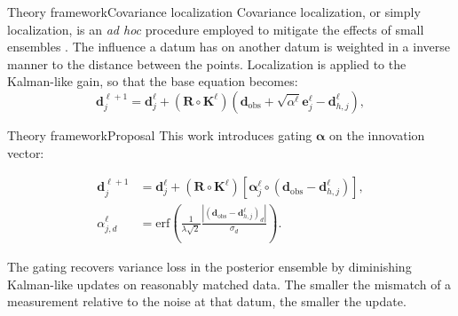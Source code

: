 \begin{frame}{Theory framework}{Covariance localization}
    Covariance localization, or simply localization, 
    is an \emph{ad hoc} procedure employed to mitigate the effects of small ensembles 
    \cite[section 7.5]{Emerick:2025}.
    \vfill
    The influence a datum has on another datum is weighted
    in a inverse manner to the distance between the points.
    \vfill
    Localization is applied to the Kalman-like gain,
    so that the base equation becomes:
    \begin{equation}
        \mathbf{d}_j^{\ell+1} 
        =
        \mathbf{d}_j^\ell + (\mathbf{R}\circ\mathbf{K}^\ell)
        (\mathbf{d}_\text{obs} + \sqrt{\alpha^\ell}\mathbf{e}_j^\ell - \mathbf{d}_{h, j}^\ell),
    \label{eq:iteration_dsiesmda}
    \end{equation}
\end{frame}

\begin{frame}{Theory framework}{Proposal}
    This work introduces gating $\bm{\alpha}$ on the innovation vector:  

    \begin{subequations}
        \begin{align}
            \mathbf{d}_j^{\ell+1} 
            &=
            \mathbf{d}_j^\ell + (\mathbf{R} \circ \mathbf{K}^\ell) 
            [
            \bm{\alpha}_j^\ell \circ 
            (\mathbf{d}_\text{obs} - \mathbf{d}_{h, j}^\ell)], 
        \label{eq:iteration_gated}
            \\
            \alpha_{j, d}^\ell 
            &= \mathrm{erf}
            \left(
                \frac{1}{\lambda \sqrt{2}}
                \frac{|(\mathbf{d}_\text{obs} - \mathbf{d}_{h, j}^\ell)_d|}{\sigma_d} 
            \right).
        \label{eq:alpha_lambda}
        \end{align}
    \end{subequations}
    
    The gating recovers variance loss in the posterior ensemble by diminishing Kalman-like updates on reasonably matched data.
    The smaller the mismatch of a measurement relative to the noise at that datum, the smaller the update.

    \begin{figure}[htbp]
        \centering
        \begin{subfigure}[b]{0.39\textwidth}
            \centering
            
        \end{subfigure}
        \begin{subfigure}[b]{0.59\textwidth}
            \centering
            
        \end{subfigure}
    \end{figure}
\end{frame}